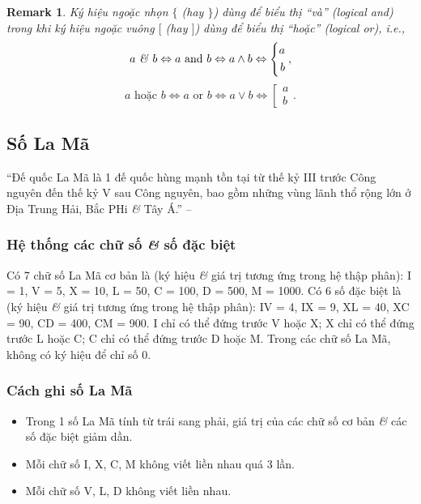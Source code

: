 \documentclass[oneside]{book}
\numberwithin{equation}{section}
\newtheorem{remark}{Remark}[section]
\begin{document}
\begin{remark}
	Ký hiệu ngoặc nhọn $\{$ (hay $\}$) dùng để biểu thị ``và'' (logical and) trong khi ký hiệu ngoặc vuông $[$ (hay $]$) dùng để biểu thị ``hoặc'' (logical or), i.e.,
	\begin{equation*}
		a\mbox{ \textit{\&} } b\Leftrightarrow a\mbox{ and } b\Leftrightarrow a\land b\Leftrightarrow\left\{\begin{split}
			a\\b
		\end{split}\right.,	
	\end{equation*}
	\begin{equation*}
		a\mbox{ hoặc } b\Leftrightarrow a\mbox{ or } b\Leftrightarrow a\lor b\Leftrightarrow\left[\begin{split}
			a\\b
		\end{split}\right..
	\end{equation*}
\end{remark}

\subsection{Số La Mã}
``Đế quốc La Mã là 1 đế quốc hùng mạnh tồn tại từ thế kỷ III trước Công nguyên đến thế kỷ V sau Công nguyên, bao gồm những vùng lãnh thổ rộng lớn ở Địa Trung Hải, Bắc PHi \textit{\&} Tây Á.'' -- \cite[p. 14]{Thai_Anh_Dat_Ha_Loan_Nam_Quang_Toan_6_tap_1}

\subsubsection{Hệ thống các chữ số \textit{\&} số đặc biệt}
Có 7 chữ số La Mã cơ bản là (ký hiệu \textit{\&} giá trị tương ứng trong hệ thập phân): I = 1, V = 5, X = 10, L = 50, C = 100, D = 500, M = 1000. Có 6 số đặc biệt là (ký hiệu \textit{\&} giá trị tương ứng trong hệ thập phân): IV = 4, IX = 9, XL = 40, XC = 90, CD = 400, CM = 900. I chỉ có thể đứng trước V hoặc X; X chỉ có thể đứng trước L hoặc C; C chỉ có thể đứng trước D hoặc M. Trong các chữ số La Mã, không có ký hiệu để chỉ số 0.

\subsubsection{Cách ghi số La Mã}
\begin{itemize}
	\item Trong 1 số La Mã tính từ trái sang phải, giá trị của các chữ số cơ bản \textit{\&} các số đặc biệt giảm dần.
	\item Mỗi chữ số I, X, C, M không viết liền nhau quá 3 lần.
	\item Mỗi chữ số V, L, D không viết liền nhau.
\end{itemize}
\end{document}
